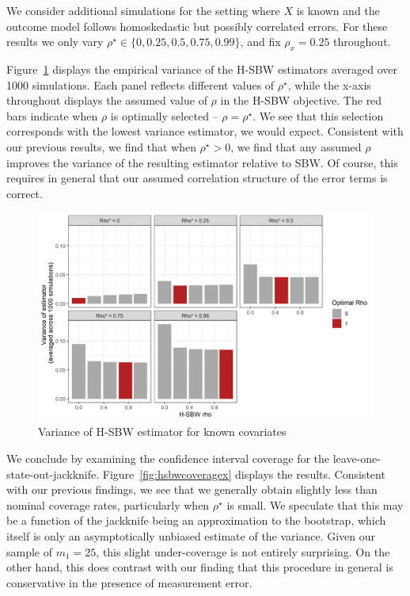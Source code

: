 We consider additional simulations for the setting where $X$ is known and the outcome model follows homoskedastic but possibly correlated errors. For these results we only vary $\rho^\star \in \{0, 0.25, 0.5, 0.75, 0.99\}$, and fix $\rho_x = 0.25$ throughout. 

Figure~\ref{fig:hsbwvarx} displays the empirical variance of the H-SBW estimators averaged over 1000 simulations. Each panel reflects different values of $\rho^\star$, while the x-axis throughout displays the assumed value of $\rho$ in the H-SBW objective. The red bars indicate when $\rho$ is optimally selected -- $\rho = \rho^\star$. We see that this selection corresponds with the lowest variance estimator, we would expect. Consistent with our previous results, we find that when $\rho^\star > 0$, we find that any assumed $\rho$ improves the variance of the resulting estimator relative to SBW. Of course, this requires in general that our assumed correlation structure of the error terms is correct.

\begin{figure}[H]
\begin{center}
    \caption{Variance of H-SBW estimator for known covariates}\label{fig:hsbwvarx}
    \includegraphics[scale=0.5]{01_Plots/variance-x-plot.png}
\end{center}
\end{figure}

We conclude by examining the confidence interval coverage for the leave-one-state-out-jackknife. Figure~\ref{fig:hsbwcoveragex} displays the results. Consistent with our previous findings, we see that we generally obtain slightly less than nominal coverage rates, particularly when $\rho^\star$ is small. We speculate that this may be a function of the jackknife being an approximation to the bootstrap, which itself is only an asymptotically unbiased estimate of the variance. Given our sample of $m_1 = 25$, this slight under-coverage is not entirely surprising. On the other hand, this does contrast with our finding that this procedure in general is conservative in the presence of measurement error. 


